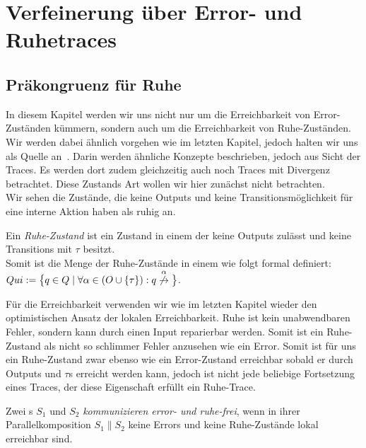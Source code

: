 \chapter{Verfeinerung über Error- und Ruhetraces}

\section{Präkongruenz für Ruhe}

In diesem Kapitel werden wir uns nicht nur um die Erreichbarkeit von
Error-Zuständen kümmern, sondern auch um die Erreichbarkeit von
Ruhe-Zuständen. Wir werden dabei ähnlich vorgehen wie im letzten Kapitel,
jedoch halten wir uns als Quelle an~\cite{Chilton2013}. Darin werden ähnliche
Konzepte beschrieben, jedoch aus Sicht der Traces. Es werden dort zudem
gleichzeitig auch noch Traces mit Divergenz betrachtet. Diese Zustands Art
wollen wir hier zunächst nicht betrachten.\\
Wir sehen die Zustände, die keine Outputs und keine Transitionsmöglichkeit für
eine interne Aktion haben als ruhig an.

\begin{Def}[Ruhe]
  Ein \emph{Ruhe-Zustand} ist ein Zustand in einem \EIO{} der keine
  Outputs zulässt und keine Transitions mit $\tau$ besitzt.\\
  Somit ist die Menge der Ruhe-Zustände in einem \EIO{} wie folgt formal
  definiert: $Qui:=\big\{q\in Q\mid \forall \alpha\in (O\cup \{\tau\}): q
  \overset{\alpha}{\not{\hspace{-0.1cm}\rightarrow}}\big\}$.
\end{Def}

Für die Erreichbarkeit verwenden wir wie im letzten Kapitel wieder den
optimistischen Ansatz der lokalen Erreichbarkeit. Ruhe ist kein
unabwendbaren Fehler, sondern kann durch einen Input reparierbar werden. Somit
ist ein Ruhe-Zustand als nicht so \glqq{}schlimmer Fehler\grqq{}  anzusehen wie
ein Error. Somit ist für uns ein Ruhe-Zustand zwar ebenso wie ein Error-Zustand
erreichbar sobald er durch Outputs und $\tau$s erreicht werden kann, jedoch ist
nicht jede beliebige Fortsetzung eines Traces, der diese Eigenschaft erfüllt
ein Ruhe-Trace.

\begin{Def}
  Zwei \EIO{}s $S_1$ und $S_2$ \emph{kommunizieren error- und ruhe-frei}, wenn
  in ihrer Parallelkomposition $S_1\| S_2$ keine Errors und keine Ruhe-Zustände
  lokal erreichbar sind.
\end{Def}

